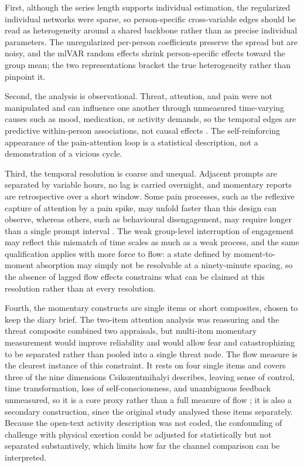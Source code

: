 \documentclass[11pt,a4paper]{article}
\begin{document}
First, although the series length supports individual estimation, the regularized individual
networks were sparse, so person-specific cross-variable edges should be read as heterogeneity
around a shared backbone rather than as precise individual parameters. The unregularized
per-person coefficients preserve the spread but are noisy, and the mlVAR random effects shrink
person-specific effects toward the group mean; the two representations bracket the true
heterogeneity rather than pinpoint it.

Second, the analysis is observational. Threat, attention, and pain were not manipulated and can
influence one another through unmeasured time-varying causes such as mood, medication, or activity
demands, so the temporal edges are predictive within-person associations, not causal effects
\citep{rohrer2018thinking}. The self-reinforcing appearance of the pain-attention loop is a
statistical description, not a demonstration of a vicious cycle.

Third, the temporal resolution is coarse and unequal. Adjacent prompts are separated by variable
hours, no lag is carried overnight, and momentary reports are retrospective over a short window.
Some pain processes, such as the reflexive capture of attention by a pain spike, may unfold faster
than this design can observe, whereas others, such as behavioural disengagement, may require longer
than a single prompt interval \citep{hamaker2017no}. The weak group-level interruption of
engagement may reflect this mismatch of time scales as much as a weak process, and the same
qualification applies with more force to flow: a state defined by moment-to-moment absorption may
simply not be resolvable at a ninety-minute spacing, so the absence of lagged flow effects
constrains what can be claimed at this resolution rather than at every resolution.

Fourth, the momentary constructs are single items or short composites, chosen to keep the diary
brief. The two-item attention analysis was reassuring and the threat composite combined two
appraisals, but multi-item momentary measurement would improve reliability and would allow fear and
catastrophizing to be separated rather than pooled into a single threat node. The flow measure is
the clearest instance of this constraint. It rests on four single items and covers three of the
nine dimensions Csikszentmihalyi describes, leaving sense of control, time transformation, loss of
self-consciousness, and unambiguous feedback unmeasured, so it is a core proxy rather than a full
measure of flow \citep{jackson2002assessing}; it is also a secondary construction, since the
original study analysed these items separately. Because the open-text activity description was not
coded, the confounding of challenge with physical exertion could be adjusted for statistically but
not separated substantively, which limits how far the channel comparison can be interpreted.
\end{document}
